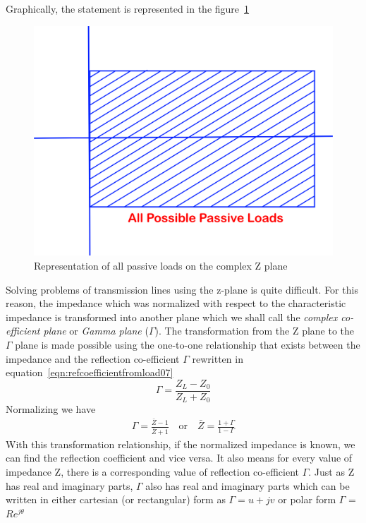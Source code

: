 Graphically, the statement is represented in the figure~\ref{fig:oigvbnkliu}
\begin{figure}[h]
\centering
\includegraphics[width=0.6\linewidth]{./graphics/oigvbnkliu}
\caption{Representation of all passive loads on the complex Z plane}
\label{fig:oigvbnkliu}
\end{figure}

Solving problems of transmission lines using the z-plane is quite difficult. For this reason, the impedance which was normalized with respect to the characteristic impedance is transformed into another plane which we shall call the \emph{complex co-efficient plane} or \emph{Gamma plane} ($\Gamma$).
The transformation from the Z plane to the $\Gamma$ plane is made possible using the one-to-one relationship that exists between the impedance and the reflection co-efficient $\Gamma$ rewritten in equation~\eqref{eqn:refcoefficientfromload07}
\begin{equation}
\Gamma = \frac{Z_L - Z_0}{Z_L + Z_0}\label{eqn:refcoefficientfromload07}
\end{equation}
Normalizing we have
\begin{align*}
\Gamma= \frac{\bar{Z} - 1}{\bar{Z} + 1}\quad\text{or}\quad\bar{Z}= \frac{1 + \Gamma}{1 - \Gamma}
\end{align*}
With this transformation relationship, if the normalized impedance is known, we can find the reflection coefficient and vice versa. It also means for every value of impedance Z, there is a corresponding value of reflection co-efficient $ \Gamma$. Just as Z has real and imaginary parts, $\Gamma$ also has real and imaginary parts which can be written in either cartesian (or rectangular) form as $\Gamma=u+jv$ or polar form $\Gamma$ = $Re^{j\theta}$

